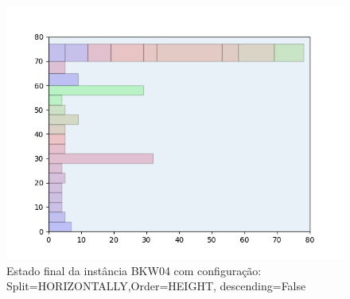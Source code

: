 \begin{figure}[H]
    \centering
    \caption[]{Estado final da instância BKW04 com configuração: Split=HORIZONTALLY,Order=HEIGHT, descending=False}
    \label{fig:bkw04-horizontally-height-false}
    \includegraphics[scale=0.5]{output/figures/bkw/bkw04/horizontally/height/false/00}
\end{figure}